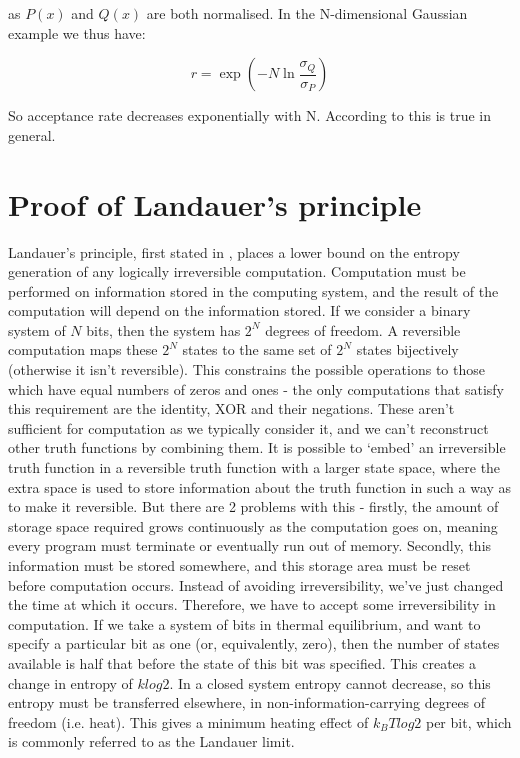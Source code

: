 \documentclass[11pt]{article} %
\begin{document}
as $P(x)$ and $Q(x)$ are both normalised. In the N-dimensional Gaussian example we thus have:

\begin{equation}
r = \exp \left(-N \ln \frac{\sigma_{Q}}{\sigma_{P}}\right)
\end{equation}

So acceptance rate decreases exponentially with N. According to \cite{mackay_information_2003} this is true in general.

\section{Proof of Landauer's principle}
Landauer's principle, first stated in \cite{landauer_irreversibility_2000}, places a lower bound on the entropy generation of any logically irreversible computation. Computation must be performed on information stored in the computing system, and the result of the computation will depend on the information stored. If we consider a binary system of $N$ bits, then the system has $2^{N}$ degrees of freedom. A reversible computation maps these $2^{N}$ states to the same set of $2^{N}$ states bijectively (otherwise it isn't reversible). This constrains the possible operations to those which have equal numbers of zeros and ones - the only computations that satisfy this requirement are the identity, XOR and their negations. These aren't sufficient for computation as we typically consider it, and we can't reconstruct other truth functions by combining them.
\newline
\newline
It is possible to `embed' an irreversible truth function in a reversible truth function with a larger state space, where the extra space is used to store information about the truth function in such a way as to make it reversible. But there are 2 problems with this - firstly, the amount of storage space required grows continuously as the computation goes on, meaning every program must terminate or eventually run out of memory. Secondly, this information must be stored somewhere, and this storage area must be reset before computation occurs. Instead of avoiding irreversibility, we've just changed the time at which it occurs.
\newline
\newline
Therefore, we have to accept some irreversibility in computation. If we take a system of bits in thermal equilibrium, and want to specify a particular bit as one (or, equivalently, zero), then the number of states available is half that before the state of this bit was specified. This creates a change in entropy of $k log 2$. In a closed system entropy cannot decrease, so this entropy must be transferred elsewhere, in non-information-carrying degrees of freedom (i.e. heat). This gives a minimum heating effect of $k_{B}T log 2$ per bit, which is commonly referred to as the Landauer limit.
\end{document}
